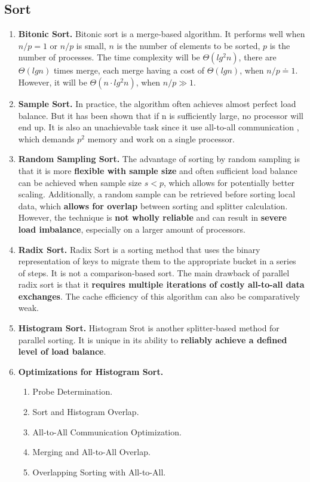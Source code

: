 \documentclass[times, 10pt,onecolumn]{article} %
\begin{document}
\subsection{Sort\cite{ps}}
\begin{enumerate}
\item{\textbf{Bitonic Sort.}} Bitonic sort is a merge-based algorithm. It performs well when $n/p = 1$ or $n/p$ is small, $n$ is the number of elements to be sorted, $p $ is the number of processes. The time complexity will be $\Theta(lg^2n)$, there are $\Theta(lgn)$ times merge, each merge having a cost of $\Theta(lg n)$, when $n/p \doteq 1 $. However, it will be $\Theta(n \cdot lg^2n)$, when $n/p \gg 1$.
\item{\textbf{Sample Sort.}} In practice, the algorithm often achieves almost perfect load balance. But it has been shown that if n is sufficiently large, no processor will end up. It is also an unachievable task since it use all-to-all communication , which demands $p^2$ memory and work on a single processor.
\item{\textbf{Random Sampling Sort.}} The advantage of sorting by random sampling is that it is more \textbf{flexible with sample size} and often sufficient load balance can be achieved when sample size $s < p$, which allows for potentially better scaling. Additionally, a random sample can be retrieved before sorting local data, which \textbf{allows for overlap} between sorting and splitter calculation. However, the technique is \textbf{not wholly reliable} and can result in \textbf{severe load imbalance}, especially on a larger amount of processors. 
\item{\textbf{Radix Sort.}} Radix Sort is a sorting method that uses the binary representation of keys to migrate them to the appropriate bucket in a series of steps. It is not a comparison-based sort. The main drawback of parallel radix sort is that it \textbf{requires multiple iterations of costly all-to-all data exchanges}. The cache efficiency of this algorithm can also be comparatively weak.
\item{\textbf{Histogram Sort.}} Histogram Srot is another splitter-based method for parallel sorting. It is unique in its ability to \textbf{reliably achieve a defined level of load balance}.
\item{\textbf{Optimizations for Histogram Sort.}}
\begin{enumerate}\item{} Probe Determination.
\item{}  Sort and Histogram Overlap.
\item{}  All-to-All Communication Optimization.
\item{}  Merging and All-to-All Overlap.
\item{} Overlapping Sorting with All-to-All. 
\end{enumerate}
\end{enumerate}
\end{document}
